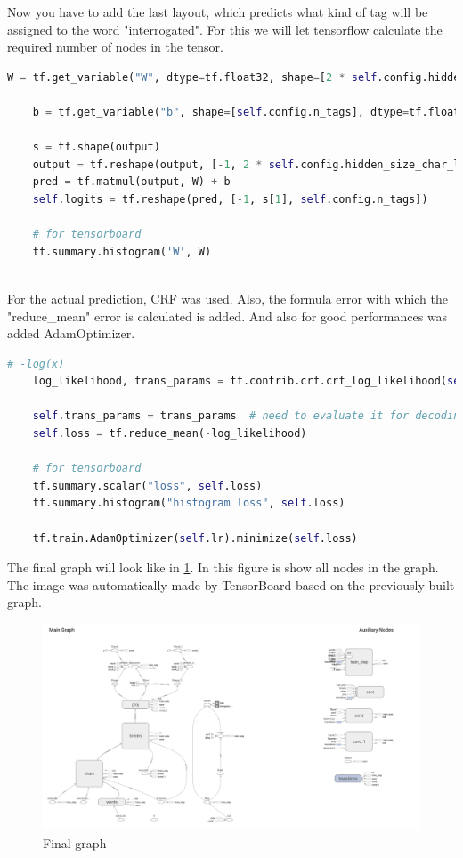 Now you have to add the last layout, which predicts what kind of tag will be assigned to the word "interrogated". For this we will let tensorflow calculate the required number of nodes in the tensor.

\begin{lstlisting}[language=Python,caption={Add last layout}]
    W = tf.get_variable("W", dtype=tf.float32, shape=[2 * self.config.hidden_size_char_lstm, self.config.n_tags])

    b = tf.get_variable("b", shape=[self.config.n_tags], dtype=tf.float32, initializer=tf.zeros_initializer())

    s = tf.shape(output)
    output = tf.reshape(output, [-1, 2 * self.config.hidden_size_char_lstm])
    pred = tf.matmul(output, W) + b
    self.logits = tf.reshape(pred, [-1, s[1], self.config.n_tags])

    # for tensorboard
    tf.summary.histogram('W', W)
        
\end{lstlisting}

For the actual prediction, CRF was used. Also, the formula error with which the "reduce\_mean" error is calculated is added. And also for good performances was added AdamOptimizer. 

\begin{lstlisting}[language=Python,caption={Add loss and optimizer}]
    # -log(x)
    log_likelihood, trans_params = tf.contrib.crf.crf_log_likelihood(self.logits, self.labels, self.sequence_lengths)
    
    self.trans_params = trans_params  # need to evaluate it for decoding
    self.loss = tf.reduce_mean(-log_likelihood)
    
    # for tensorboard
    tf.summary.scalar("loss", self.loss)
    tf.summary.histogram("histogram loss", self.loss)
    
    tf.train.AdamOptimizer(self.lr).minimize(self.loss)
\end{lstlisting}


The final graph will look like in \figurename {\ref{fig:finalGraph}}. In this figure is show all nodes in the graph. The image was automatically made by TensorBoard based on the previously built graph.

\begin{figure}[H]
  \centering
  \includegraphics[width=6.5in]{images/finalGraph.png}
  \caption {Final graph}
  \label{fig:finalGraph}
\end{figure}

